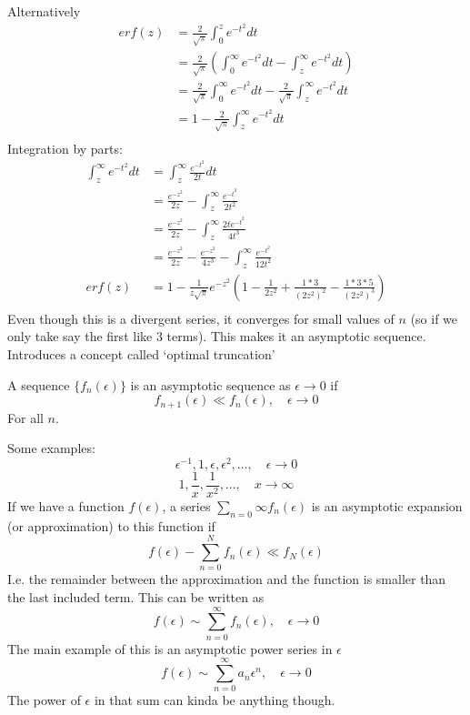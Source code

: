 \documentclass{X:/Documents/Coding/Latex/myassignment}
\begin{document}
Alternatively
\begin{align*}
        erf(z) &= \frac{2}{\sqrt{\pi}} \int_0^z e^{-t^2}dt\\
        &= \frac{2}{\sqrt{\pi}} \left(\int_0^\infty e^{-t^2} dt - \int_z^\infty e^{-t^2} dt\right)\\
        &= \frac{2}{\sqrt{\pi}} \int_0^\infty e^{-t^2} dt - \frac{2}{\sqrt{\pi}}\int_z^\infty e^{-t^2} dt\\
        &= 1 - \frac{2}{\sqrt{\pi}}\int_z^\infty e^{-t^2} dt\\
\end{align*}
Integration by parts:
\begin{align*}
    \int_z^\infty e^{-t^2}dt &= \int_z^\infty \frac{e^{-t^2}}{2t}dt\\
    &= \frac{e^{-z^2}}{2z}- \int_z^\infty \frac{e^{-t^2}}{2t^2}\\
    &= \frac{e^{-z^2}}{2z} - \int_z^\infty \frac{2te^{-t^2}}{4t^3}\\
    &= \frac{e^{-z^2}}{2z} - \frac{e^{-z^2}}{4z^3} - \int_z^\infty \frac{e^{-t^2}}{12t^2}\\
    erf(z)&=1- \frac{1}{z\sqrt{\pi}}e^{-z^2}\left(1 - \frac{1}{2z^2} + \frac{1*3}{(2z^2)^2} - \frac{1*3*5}{(2z^2)^3} \right)\\
\end{align*}
Even though this is a divergent series, it converges for small values of $n$ (so if we only take say the first like 3 terms). This makes it an asymptotic sequence.\\
Introduces a concept called `optimal truncation'

A sequence $\{f_n(\epsilon)\}$ is an asymptotic sequence as $\epsilon\to 0$ if
\[f_{n+1}(\epsilon) \ll f_n(\epsilon), \quad \epsilon\to0\]
For all $n$.


Some examples:
\[\epsilon^{-1},1,\epsilon,\epsilon^2,\hdots, \quad \epsilon\to0\]
\[1, \frac1x,\frac1{x^2},\hdots, \quad x\to\infty\]
If we have a function $f(\epsilon)$, a series $\sum_{n=0}\infty f_n(\epsilon)$ is an asymptotic expansion (or approximation) to this function if
\[f(\epsilon) - \sum_{n=0}^N f_n(\epsilon) \ll f_N(\epsilon)\]
I.e. the remainder between the approximation and the function is smaller than the last included term. This can be written as
\[f(\epsilon) \sim \sum_{n=0}^\infty f_n(\epsilon), \quad \epsilon\to 0\]
The main example of this is an asymptotic power series in $\epsilon$
\[f(\epsilon) \sim \sum_{n=0}^\infty a_n \epsilon^n, \quad \epsilon\to 0\]
The power of $\epsilon$ in that sum can kinda be anything though.
\end{document}
